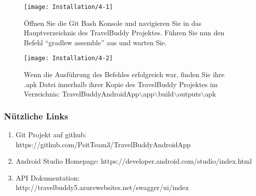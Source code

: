 \begin{figure}
  \centering
  \texttt{[image: Installation/4-1]}
  \caption{Öffnen Sie die Git Bash Konsole und navigieren Sie in das Hauptverzeichnis des TravelBuddy Projektes. Führen Sie nun den Befehl ``gradlew assemble'' aus und warten Sie.}
\end{figure}

\begin{figure}
  \centering
  \texttt{[image: Installation/4-2]}
  \caption{Wenn die Ausführung des Befehles erfolgreich war, finden Sie ihre .apk Datei innerhalb ihrer Kopie des TravelBuddy Projektes im Verzeichnis: TravelBuddyAndroidApp$\backslash$app$\backslash$build$\backslash$outputs$\backslash$apk}
\end{figure}

\subsubsection{Nützliche Links}
  \begin{enumerate}
    \item Git Projekt auf github: https://github.com/PsitTeam3/TravelBuddyAndroidApp
    \item Android Studio Homepage: https://developer.android.com/studio/index.html
    \item API Dokumentation: http://travelbuddy5.azurewebsites.net/swagger/ui/index
  \end{enumerate}
